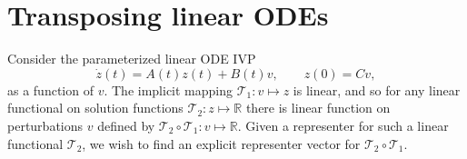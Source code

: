 \documentclass{article}
\begin{document}
\section{Transposing linear ODEs}
Consider the parameterized linear ODE IVP
\begin{equation}
    \dot z(t) = A(t) z(t) + B(t) v, \qquad z(0) = C v,
    \label{eq:linear_ode}
\end{equation}
as a function of $v$.
The implicit mapping $\mathcal{T}_1: v \mapsto z$ is linear, and so for any
linear functional on solution functions $\mathcal{T}_2 : z \mapsto \mathbb{R}$
there is linear function on perturbations $v$ defined by $\mathcal{T}_2 \circ
\mathcal{T}_1 : v \mapsto \mathbb{R}$. Given a representer for such a linear
functional $\mathcal{T}_2$, we wish to find an explicit representer vector for
$\mathcal{T}_2 \circ \mathcal{T}_1$.

\end{document}
